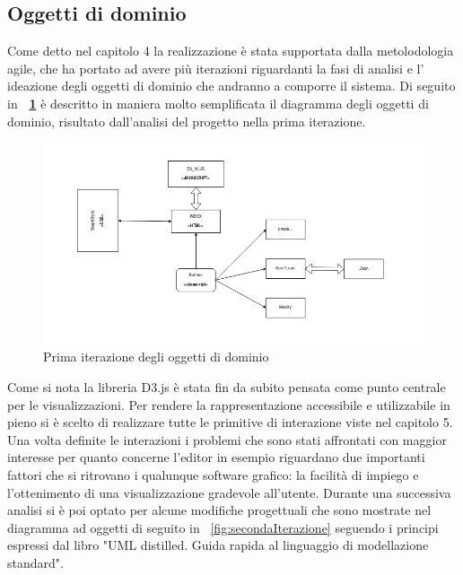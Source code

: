 {\subsection{Oggetti di dominio}
Come detto nel capitolo 4 la realizzazione è stata supportata dalla metolodologia agile, che ha portato ad avere più iterazioni riguardanti la fasi di analisi e l' ideazione degli oggetti di dominio che andranno a comporre il sistema. 
Di seguito in \textbf{\figurename~\ref{fig:primaIterazione}} è descritto in maniera molto semplificata il diagramma degli oggetti di dominio, risultato dall'analisi del progetto nella prima iterazione.\\
\begin{figure}[!htb]
	\begin{center}
		\includegraphics[width=1 \linewidth]{figure/primaIterazione}
	\end{center}
	\caption{Prima iterazione degli oggetti di dominio\label{fig:primaIterazione}}
\end{figure}
\newline
Come si nota la libreria D3.js è stata fin da subito pensata come punto centrale per le visualizzazioni. Per rendere la rappresentazione accessibile e utilizzabile in pieno si è scelto di realizzare tutte le primitive di interazione viste nel capitolo 5.\\
Una volta definite le interazioni i problemi che sono stati affrontati con maggior interesse per quanto concerne l'editor in esempio riguardano due importanti fattori che si ritrovano i qualunque software grafico: la facilità di impiego e l'ottenimento di una visualizzazione gradevole all'utente.
Durante una successiva analisi si è poi optato per alcune modifiche progettuali che sono mostrate nel diagramma ad oggetti di seguito in \figurename~\ref{fig:secondaIterazione} seguendo i principi espressi dal libro "UML distilled. Guida rapida al linguaggio di modellazione standard"\cite{UML:10}.\\
}
